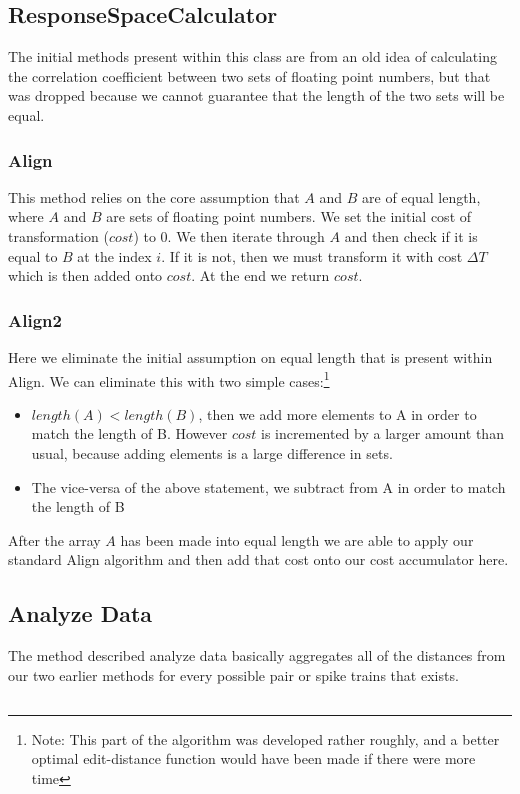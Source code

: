 \documentclass[12pt]{article} %
\begin{document}
\subsection{ResponseSpaceCalculator}
The initial methods present within this class are from an old idea of calculating the correlation coefficient between two sets of floating point numbers, but that was dropped because we cannot guarantee that the length of the two sets will be equal. 
\subsubsection{Align}
This method relies on the core assumption that $A$ and $B$ are of equal length, where $A$ and $B$ are sets of floating point numbers. We set the initial cost of transformation ($cost$) to 0. We then iterate through $A$ and then check if it is equal to $B$ at the index $i$. If it is not, then we must transform it with cost $\Delta T$ which is then added onto $cost$. At the end we return $cost$. 

\subsubsection{Align2}
Here we eliminate the initial assumption on equal length that is present within Align. We can eliminate this with two simple cases:\footnote{Note: This part of the algorithm was developed rather roughly, and a better optimal edit-distance function would have been made if there were more time}
\begin{itemize}
\item $length(A) < length(B)$, then we add more elements to A in order to match the length of B. However $cost$ is incremented by a larger amount than usual, because adding elements is a large difference in sets. 

\item The vice-versa of the above statement, we subtract from A in order to match the length of B 
\end{itemize}
After the array $A$ has been made into equal length we are able to apply our standard Align algorithm and then add that cost onto our cost accumulator here. 

\subsection{Analyze Data}
The method described analyze data basically aggregates all of the distances from our two earlier methods for every possible pair or spike trains that exists. 

\subsection{}
\end{document}

